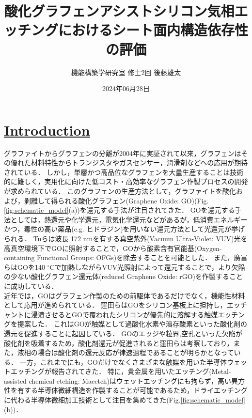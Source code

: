 \documentclass[platex,dvipdfmx]{jlreq}			%
\title{酸化グラフェンアシストシリコン気相エッチングにおけるシート面内構造依存性の評価}
\author{機能構築学研究室 修士2回 後藤雄太}
\date{2024年06月28日}
\begin{document}
\maketitle

\section*{\ul{Introduction}}
グラファイトからグラフェンの分離が2004年に実証されて以来\supercite{novoselov_electric_2004}，グラフェンはその優れた材料特性からトランジスタやガスセンサー，潤滑剤などへの応用が期待されている\supercite{schwierz_graphene_2010, lu_toward_2011, chen_hgii_2012, jin_lubrication_2023}．
しかし，単層かつ高品位なグラフェンを大量生産することは技術的に難しく，実用化に向けた低コスト・高効率なグラフェン作製プロセスの開発が求められている．
このグラフェンの生産方法として，グラファイトを酸化および，剥離して得られる酸化グラフェン(Graphene Oxide: GO)(Fig.\ref{fig:schematic_model}(a))を還元する手法が注目されてきた．
GOを還元する手法としては，熱還元\supercite{song_effect_2013}や化学還元\supercite{de_silva_highquality_2022}，電気化学還元\supercite{shao_facile_2010}などがあるが，低消費エネルギーかつ，毒性の高い薬品(e.g. ヒドラジン)を用いない還元方法として光還元\supercite{matsumoto_photoreduction_2010}が挙げられる．
Tuらは波長 172 nmを有する真空紫外(Vacuum Ultra-Violet: VUV)光を高真空環境下でGOに照射することで，GOから酸素含有官能基(Oxygen-containing Functional Groups: OFGs)を除去することを可能とした\supercite{tu_reductive_2014}．
また，廣富らはGOを140 ${}^\circ$Cで加熱しながらVUV光照射によって還元することで，より欠陥の少ない酸化グラフェン還元体(reduced Graphene Oxide: rGO)を作製することに成功している\supercite{hirotomi_fabrication_2022}．\\
\indent
近年では，GOはグラフェン作製のための前駆体であるだけでなく，機能性材料として応用が進められている．
窪田らはGOをシリコン基板上に担持し，エッチャントに浸漬させるとGOで覆われたシリコンが優先的に溶解する触媒エッチングを提案した\supercite{kubota_chemical_2019}．
これはGOが触媒として過酸化水素や溶存酸素といった酸化剤の還元を促進することに起因している．
GOのエッジや粒界,空孔といった欠陥が酸化剤を吸着する\supercite{kamiya_graphene_2014}ため，酸化剤還元が促進されると窪田らは考察しており，また，液相の場合は酸化剤の還元反応が律速過程であることが明らかとなっている\supercite{kubota_chemical_2021}．
一方，これまでにも，GOだけでなくさまざまな触媒を用いた半導体ウェットエッチングが報告されてきた\supercite{wilhelm_ordered_2019, jeong_titanium_nitride_2019, gayrard_replacing_2021, yamamoto_mos_2024}．
特に，貴金属を用いたエッチング(Metal-assisted chemical etching: Macetch)はウェットエッチングにも拘らず，高い異方性を有する半導体微細構造を作製することが可能であるため，ドライエッチングに代わる半導体微細加工技術として注目を集めてきた(Fig.\ref{fig:schematic_model}(b))\supercite{huang_metal-assisted_2010, lianto_vertical_2012, li_deep_2014}．
\end{document}
